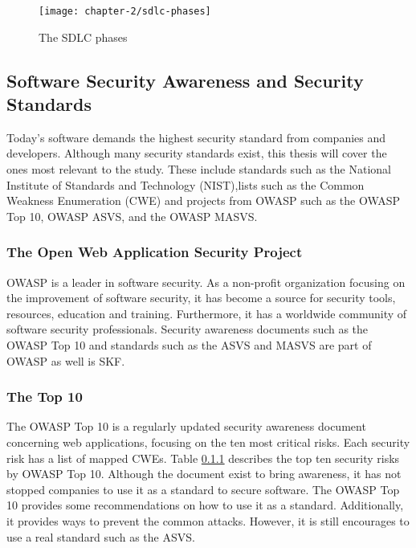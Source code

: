 \begin{figure}
    \centering
    \caption{The SDLC phases}
    \label{fig:sdlc-phaces}
    \texttt{[image: chapter-2/sdlc-phases]}
\end{figure}

\subsection{Software Security Awareness and Security Standards}
Today's software demands the highest security standard from companies and developers. Although many security standards exist, this thesis will cover the ones most relevant to the study. These include standards such as the National Institute of Standards and Technology (NIST),lists such as the Common Weakness Enumeration (CWE) and projects from OWASP such as the OWASP Top 10, OWASP ASVS, and the OWASP MASVS. 

\subsubsection{The Open Web Application Security Project}
OWASP is a leader in software security. As a non-profit organization focusing on the improvement of software security, it has become a source for security tools, resources, education and training. Furthermore, it has a worldwide community of software security professionals. Security awareness documents such as the OWASP Top 10 and standards such as the ASVS and MASVS are part of OWASP as well is SKF.

\subsubsection{The Top 10}\label{sec:owasp-top-10}
The OWASP Top 10 is a regularly updated security awareness document concerning web applications, focusing on the ten most critical risks. Each security risk has a list of mapped CWEs. Table \ref{} describes the top ten security risks by OWASP Top 10. Although the document exist to bring awareness, it has not stopped companies to use it as a standard to secure software. The OWASP Top 10 provides some recommendations on how to use it as a standard. Additionally, it provides ways to prevent the common attacks. However, it is still encourages to use a real standard such as the ASVS.

